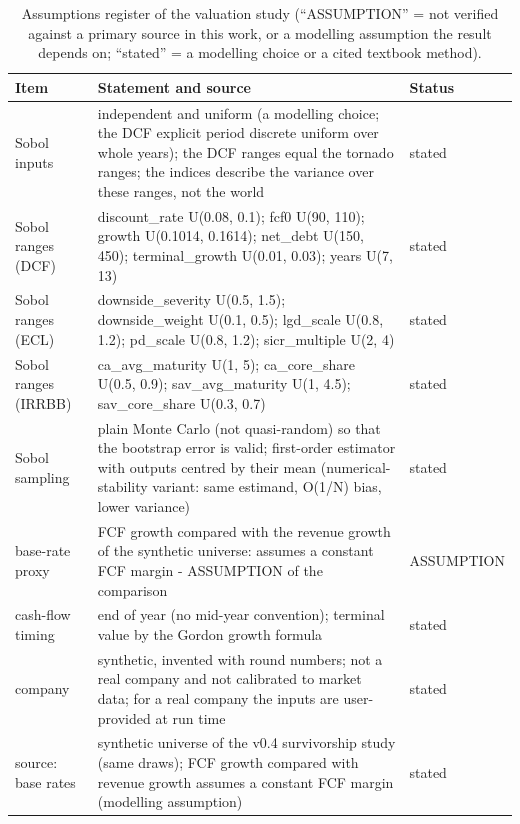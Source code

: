 \begin{table}[H]
\centering
\scriptsize
\caption{Assumptions register of the valuation study (``ASSUMPTION'' = not verified against a primary source in this work, or a modelling assumption the result depends on; ``stated'' = a modelling choice or a cited textbook method).}
\label{tab:D5_assumptions}
\setlength{\tabcolsep}{3pt}
\begin{tabular}{>{\raggedright\arraybackslash}p{3.0cm}>{\raggedright\arraybackslash}p{10.6cm}>{\raggedright\arraybackslash}p{2.1cm}}
\toprule
Item & Statement and source & Status \\
\midrule
Sobol inputs & independent and uniform (a modelling choice; the DCF explicit period discrete uniform over whole years); the DCF ranges equal the tornado ranges; the indices describe the variance over these ranges, not the world & stated \\
Sobol ranges (DCF) & discount\_rate U(0.08, 0.1); fcf0 U(90, 110); growth U(0.1014, 0.1614); net\_debt U(150, 450); terminal\_growth U(0.01, 0.03); years U(7, 13) & stated \\
Sobol ranges (ECL) & downside\_severity U(0.5, 1.5); downside\_weight U(0.1, 0.5); lgd\_scale U(0.8, 1.2); pd\_scale U(0.8, 1.2); sicr\_multiple U(2, 4) & stated \\
Sobol ranges (IRRBB) & ca\_avg\_maturity U(1, 5); ca\_core\_share U(0.5, 0.9); sav\_avg\_maturity U(1, 4.5); sav\_core\_share U(0.3, 0.7) & stated \\
Sobol sampling & plain Monte Carlo (not quasi-random) so that the bootstrap error is valid; first-order estimator with outputs centred by their mean (numerical-stability variant: same estimand, O(1/N) bias, lower variance) & stated \\
base-rate proxy & FCF growth compared with the revenue growth of the synthetic universe: assumes a constant FCF margin - ASSUMPTION of the comparison & ASSUMPTION \\
cash-flow timing & end of year (no mid-year convention); terminal value by the Gordon growth formula & stated \\
company & synthetic, invented with round numbers; not a real company and not calibrated to market data; for a real company the inputs are user-provided at run time & stated \\
source: base rates & synthetic universe of the v0.4 survivorship study (same draws); FCF growth compared with revenue growth assumes a constant FCF margin (modelling assumption) & stated \\

\end{tabular}
\end{table}
